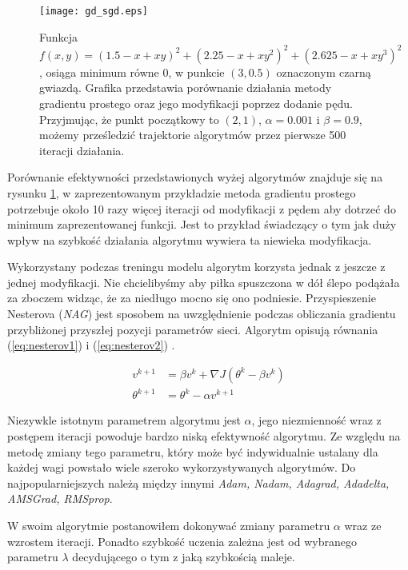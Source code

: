 \documentclass[11pt]{book}
\theoremstyle{definition}
\begin{document}
\begin{figure}[h	]
	\centering
	\texttt{[image: gd\_sgd.eps]}
	\caption{Funkcja  $f(x,y) =(1.5 - x + xy)^2 + (2.25 - x + xy^2)^2 + (2.625 - x + xy^3)^2$, osiąga minimum równe 0, w punkcie $(3,0.5)$ oznaczonym  czarną gwiazdą. Grafika przedstawia porównanie działania metody gradientu prostego oraz jego modyfikacji poprzez dodanie pędu. Przyjmując, że punkt początkowy to $(2,1)$, $\alpha = 0.001$ i $\beta = 0.9$, możemy prześledzić trajektorie algorytmów przez pierwsze 500 iteracji działania.} 
	\label{fig:gd_sgd}
\end{figure}

Porównanie efektywności przedstawionych wyżej algorytmów znajduje się na rysunku \ref{fig:gd_sgd}, w zaprezentowanym przykładzie metoda gradientu prostego potrzebuje około 10 razy więcej iteracji od modyfikacji z pędem aby dotrzeć do minimum zaprezentowanej funkcji. Jest to przykład świadczący o tym jak duży wpływ na szybkość działania algorytmu wywiera ta niewieka modyfikacja. 


Wykorzystany podczas treningu modelu algorytm korzysta jednak z jeszcze z jednej modyfikacji. Nie chcielibyśmy aby piłka spuszczona w dół ślepo podążała za zboczem widząc, że za niedługo mocno się ono podniesie. Przyspieszenie Nesterova (\textit{NAG}) jest sposobem na uwzględnienie podczas obliczania gradientu przybliżonej przyszłej pozycji parametrów sieci. Algorytm opisują równania (\ref{eq:nesterov1}) i (\ref{eq:nesterov2}) \cite{2016arXiv160904747R}.

\begin{align} 
v^{k+1} &=  \beta v^{k}+ \nabla J(\theta^{k} - \beta v^{k}) \label{eq:nesterov1} \\[0.4em]
\theta^{k+1} &=  \theta^{k }- \alpha v^{k+1} \label{eq:nesterov2}
\end{align}



Niezywkle istotnym parametrem algorytmu jest $\alpha$, jego niezmienność wraz z postępem iteracji powoduje bardzo niską efektywność algorytmu. Ze względu na metodę zmiany tego parametru, który może być indywidualnie ustalany dla każdej wagi powstało wiele szeroko wykorzystywanych algorytmów. Do najpopularniejszych należą między innymi \textit{Adam, Nadam, Adagrad, Adadelta, AMSGrad, RMSprop}. 

W swoim algorytmie postanowiłem dokonywać zmiany parametru $\alpha$ wraz ze wzrostem iteracji. Ponadto szybkość uczenia zależna jest od wybranego parametru $\lambda$ decydującego o tym z jaką szybkością maleje.
\end{document}
